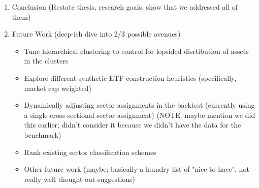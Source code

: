 \documentclass[../main.tex]{subfiles}
\begin{document}
\begin{enumerate}
    
    \item Conclusion (Restate thesis, research goals, show that we addressed all of them)

    \item Future Work (deep-ish dive into 2/3 possible avenues)
    \begin{itemize}
        \item Tune hierarchical clustering to control for lopsided disrtibution of assets in the clusters
        \item Explore different synthetic ETF construction heuristics (specifically, market cap weighted)
        \item Dynamically adjusting sector assignments in the backtest (currently using a single cross-sectional sector assignment) (NOTE: maybe mention we did this earlier; didn't consider it because we didn't have the data for the benchmark)
        \item Rank existing sector classification schemes
        \item Other future work (maybe; basically a laundry list of "nice-to-have", not really well thought out suggestions)
    \end{itemize}
    
\end{enumerate}
\end{document}
